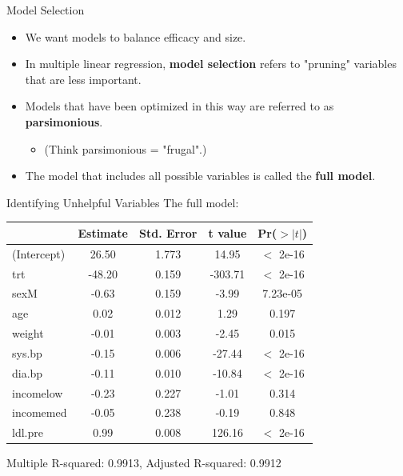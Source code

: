 \begin{frame}{Model Selection}
    \begin{itemize}
        \item We want models to balance efficacy and size.
        \item In multiple linear regression, \textbf{model selection} refers to "pruning" variables that are less important.
        \item Models that have been optimized in this way are referred to as \textbf{parsimonious}. 
        \begin{itemize}
            \item (Think parsimonious = "frugal".)
        \end{itemize}
        \item The model that includes all possible variables is called the \textbf{full model}. 
    \end{itemize}
\end{frame}

\begin{frame}{Identifying Unhelpful Variables}
    The full model:
    \begin{table}[h]
        \centering
        \begin{tabular}{lcccc}
            \hline
                        & Estimate & Std. Error & t value & Pr($>|t|$) \\
            \hline
            (Intercept) & 26.50  & 1.773 &  14.95 & $<$ 2e-16 \\
            trt     &    -48.20  & 0.159 &-303.71 & $<$ 2e-16 \\
            sexM    &     -0.63  & 0.159 &  -3.99 & 7.23e-05 \\
            age     &      0.02  & 0.012  &  1.29 &  0.197     \\
            weight  &     -0.01  & 0.003 &  -2.45 &  0.015   \\
            sys.bp  &     -0.15  & 0.006 & -27.44 & $<$ 2e-16 \\
            dia.bp  &     -0.11  & 0.010 & -10.84 & $<$ 2e-16 \\
            incomelow  &  -0.23  & 0.227 &  -1.01 &  0.314     \\
            incomemed  &  -0.05 &  0.238 &  -0.19  & 0.848     \\
            ldl.pre    &   0.99  & 0.008 & 126.16 & $<$ 2e-16 \\
            \hline
        \end{tabular}
    \end{table}
    Multiple R-squared:  0.9913,	Adjusted R-squared:  0.9912 
\end{frame}

